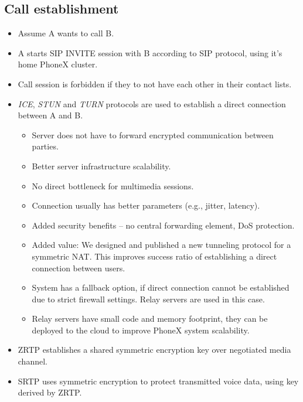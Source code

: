 \documentclass[a4paper,10pt]{article}
\begin{document}
\subsection{Call establishment}
\begin{itemize}
 \item Assume A wants to call B.
 \item A starts SIP INVITE session with B according to SIP protocol, using it's home PhoneX cluster.
 \item Call session is forbidden if they to not have each other in their contact lists.
 \item \emph{ICE}, \emph{STUN} and \emph{TURN} protocols are used to establish a direct connection between A and B.
\begin{itemize}
 \item Server does not have to forward encrypted communication between parties.
 \item Better server infrastructure scalability. 
 \item No direct bottleneck for multimedia sessions.
 \item Connection usually has better parameters (e.g., jitter, latency).
 \item Added security benefits -- no central forwarding element, DoS protection.
 \item Added value: We designed and published a new tunneling protocol for a symmetric NAT. 
This improves success ratio of establishing a direct connection between users.
 \item System has a fallback option, if direct connection cannot be established due to strict firewall settings. Relay servers are used in this case.
 \item Relay servers have small code and memory footprint, they can be deployed to the cloud to improve PhoneX system scalability.
\end{itemize}
 \item ZRTP establishes a shared symmetric encryption key over negotiated media channel.
 \item SRTP uses symmetric encryption to protect transmitted voice data, using key derived by ZRTP.
\end{itemize}
\end{document}
